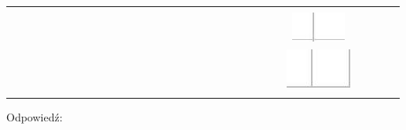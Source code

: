 \documentclass[10pt]{article}
\begin{document}
\begin{center}
\begin{tabular}{|c|c|c|c|c|c|c|c|c|c|c|c|c|c|c|c|c|c|c|c|c|c|c|c|c|c|c|c|c|c|}
 &  &  &  &  \\
\hline
 &  &  &  &  &  &  &  &  &  &  &  &  &  &  &  &  &  &  &  &  &  &  &  &  &  &  &  &  &  \\
\hline
 &  &  &  &  &  &  &  &  &  &  &  &  &  &  &  &  &  &  &  &  &  &  &  &  & \includegraphics[max width=\textwidth]{2024_11_21_6438f6dbc3784fe6d1deg-08(4)}
 &  &  &  &  \\
\hline
 &  &  &  &  &  &  &  &  &  &  &  &  &  &  &  &  &  &  &  &  &  &  &  &  & \includegraphics[max width=\textwidth]{2024_11_21_6438f6dbc3784fe6d1deg-08(1)}
 &  &  &  &  \\
\hline
\end{tabular}
\end{center}

Odpowiedź:
\end{document}
